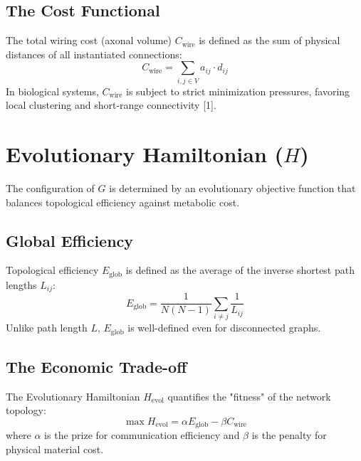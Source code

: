 \documentclass[11pt,fleqn]{article}
\begin{document}
\subsection{The Cost Functional}
The total wiring cost (axonal volume) $C_{\text{wire}}$ is defined as the sum of physical distances of all instantiated connections:
\begin{equation}
    C_{\text{wire}} = \sum_{i,j \in V} a_{ij} \cdot d_{ij}
\end{equation}
In biological systems, $C_{\text{wire}}$ is subject to strict minimization pressures, favoring local clustering and short-range connectivity [1].

\section{Evolutionary Hamiltonian ($H$)}
The configuration of $G$ is determined by an evolutionary objective function that balances topological efficiency against metabolic cost.

\subsection{Global Efficiency}
Topological efficiency $E_{\text{glob}}$ is defined as the average of the inverse shortest path lengths $L_{ij}$:
\begin{equation}
    E_{\text{glob}} = \frac{1}{N(N-1)} \sum_{i \neq j} \frac{1}{L_{ij}}
\end{equation}
Unlike path length $L$, $E_{\text{glob}}$ is well-defined even for disconnected graphs.

\subsection{The Economic Trade-off}
The Evolutionary Hamiltonian $H_{\text{evol}}$ quantifies the "fitness" of the network topology:
\begin{equation}
    \max H_{\text{evol}} = \alpha E_{\text{glob}} - \beta C_{\text{wire}}
\end{equation}
where $\alpha$ is the prize for communication efficiency and $\beta$ is the penalty for physical material cost.
\end{document}
